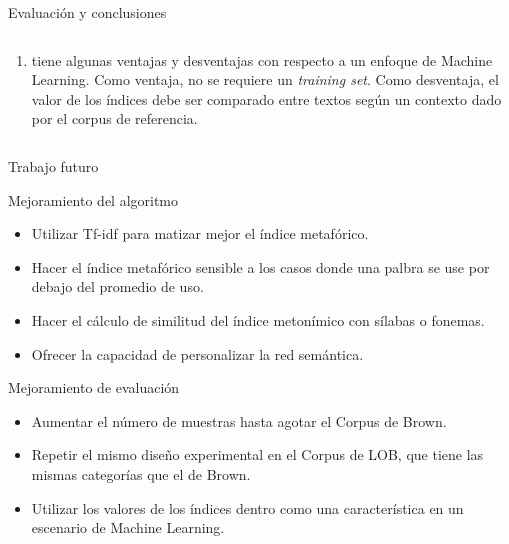 \documentclass[presentation]{beamer}
\begin{document}
\begin{frame}[label={sec:org7700b04}]{Evaluación y conclusiones}
\begin{columns}
\begin{column}{0.48\columnwidth}
\begin{enumerate}
\item tiene algunas ventajas y desventajas con respecto a un enfoque de
Machine Learning. Como ventaja, no se requiere un \emph{training
set}. Como desventaja, el valor de los índices debe ser comparado
entre textos según un contexto dado por el corpus de referencia.
\end{enumerate}
\end{column}
\end{columns}
\end{frame}

\begin{frame}[label={sec:org59a57dc}]{Trabajo futuro}
\begin{block}{Mejoramiento del algoritmo}
\begin{itemize}
\item Utilizar Tf-idf para matizar mejor el índice metafórico.
\item Hacer el índice metafórico sensible a los casos donde una palbra se use por debajo del promedio de uso.
\item Hacer el cálculo de similitud del índice metonímico con sílabas o fonemas.
\item Ofrecer la capacidad de personalizar la red semántica.
\end{itemize}
\end{block}

\begin{block}{Mejoramiento de evaluación}
\begin{itemize}
\item Aumentar el número de muestras hasta agotar el Corpus de Brown.
\item Repetir el mismo diseño experimental en el Corpus de LOB, que tiene las mismas categorías que el de Brown.
\item Utilizar los valores de los índices dentro como una característica en un escenario de Machine Learning.
\end{itemize}
\end{block}
\end{frame}
\end{document}
